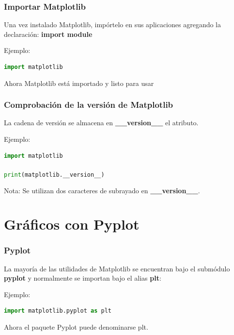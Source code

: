 \begin{frame}[fragile]
  \frametitle{Importar Matplotlib}
    Una vez instalado Matplotlib, impórtelo en sus aplicaciones
    agregando la declaración: \textbf{import module}
  \begin{exampleblock}{Ejemplo:}
    \begin{lstlisting}[language=Python]
import matplotlib
    \end{lstlisting}
  \end{exampleblock}
  Ahora Matplotlib está importado y listo para usar
\end{frame}

\begin{frame}[fragile]
  \frametitle{Comprobación de la versión de Matplotlib}

  La cadena de versión se almacena en \textbf{\_\_version\_\_} el atributo.

  \begin{exampleblock}{Ejemplo:}
    \begin{lstlisting}[language=Python]
import matplotlib

print(matplotlib.__version__)
    \end{lstlisting}
  \end{exampleblock}
  \begin{block}{Nota:}
    Se utilizan dos caracteres de subrayado en \textbf{\_\_version\_\_}.
  \end{block}
\end{frame}

\section{Gráficos con Pyplot}

\begin{frame}[fragile]
  \frametitle{Pyplot}

  La mayoría de las utilidades de Matplotlib se encuentran
  bajo el submódulo \textbf{pyplot} y normalmente se importan
  bajo el alias \textbf{plt}:

  \begin{exampleblock}{Ejemplo:}
    \begin{lstlisting}[language=Python]
import matplotlib.pyplot as plt 
    \end{lstlisting}
  \end{exampleblock}
  Ahora el paquete Pyplot puede denominarse plt.
\end{frame}

